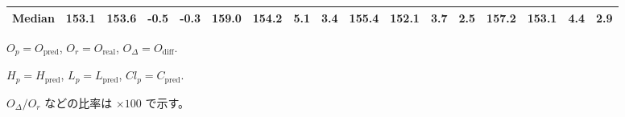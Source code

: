 \begin{threeparttable}
{\begin{tabular}{lrrrrrrrrrrrrrrrr}
 Median & 153.1 & 153.6 &       -0.5 &           -0.3 & 159.0 & 154.2 &        5.1 &            3.4 & 155.4 & 152.1 &        3.7 &            2.5 &  157.2 &  153.1 &         4.4 &              2.9 \\
\bottomrule
\end{tabular}
}
\begin{tablenotes}\footnotesize
\item $O_p=O_{\text{pred}}$, $O_r=O_{\text{real}}$, $O_\Delta=O_{\text{diff}}$.
\item $H_p=H_{\text{pred}}$, $L_p=L_{\text{pred}}$, $Cl_p=C_{\text{pred}}$.
\item $O_\Delta/O_r$ などの比率は \(\times100\) で示す。
\end{tablenotes}
\end{threeparttable}
\endgroup
